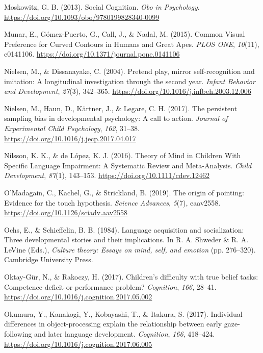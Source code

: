 \documentclass[
]{scrbook}
\newlength{\cslhangindent}
\newenvironment{CSLReferences}[2] %
 {\begin{list}{}{%
  \setlength{\itemindent}{0pt}
  \setlength{\leftmargin}{0pt}
  \setlength{\parsep}{0pt}
  \ifodd #1
   \setlength{\leftmargin}{\cslhangindent}
   \setlength{\itemindent}{-1\cslhangindent}
  \fi
  \setlength{\itemsep}{#2\baselineskip}}}
 {\end{list}}
\begin{document}
\begin{CSLReferences}{1}{0}
Moskowitz, G. B. (2013). Social {Cognition}. \emph{Obo in Psychology}. \url{https://doi.org/10.1093/obo/9780199828340-0099}

Munar, E., Gómez-Puerto, G., Call, J., \& Nadal, M. (2015). Common {Visual Preference} for {Curved Contours} in {Humans} and {Great Apes}. \emph{PLOS ONE}, \emph{10}(11), e0141106. \url{https://doi.org/10.1371/journal.pone.0141106}

Nielsen, M., \& Dissanayake, C. (2004). Pretend play, mirror self-recognition and imitation: A longitudinal investigation through the second year. \emph{Infant Behavior and Development}, \emph{27}(3), 342--365. \url{https://doi.org/10.1016/j.infbeh.2003.12.006}

Nielsen, M., Haun, D., Kärtner, J., \& Legare, C. H. (2017). The persistent sampling bias in developmental psychology: {A} call to action. \emph{Journal of Experimental Child Psychology}, \emph{162}, 31--38. \url{https://doi.org/10.1016/j.jecp.2017.04.017}

Nilsson, K. K., \& de López, K. J. (2016). Theory of {Mind} in {Children With Specific Language Impairment}: {A Systematic Review} and {Meta-Analysis}. \emph{Child Development}, \emph{87}(1), 143--153. \url{https://doi.org/10.1111/cdev.12462}

O'Madagain, C., Kachel, G., \& Strickland, B. (2019). The origin of pointing: {Evidence} for the touch hypothesis. \emph{Science Advances}, \emph{5}(7), eaav2558. \url{https://doi.org/10.1126/sciadv.aav2558}

Ochs, E., \& Schieffelin, B. B. (1984). Language acquisition and socialization: {Three} developmental stories and their implications. In R. A. Shweder \& R. A. LeVine (Eds.), \emph{Culture theory: {Essays} on mind, self, and emotion} (pp. 276--320). Cambridge University Press.

Oktay-Gür, N., \& Rakoczy, H. (2017). Children's difficulty with true belief tasks: {Competence} deficit or performance problem? \emph{Cognition}, \emph{166}, 28--41. \url{https://doi.org/10.1016/j.cognition.2017.05.002}

Okumura, Y., Kanakogi, Y., Kobayashi, T., \& Itakura, S. (2017). Individual differences in object-processing explain the relationship between early gaze-following and later language development. \emph{Cognition}, \emph{166}, 418--424. \url{https://doi.org/10.1016/j.cognition.2017.06.005}


\end{CSLReferences}
\end{document}
